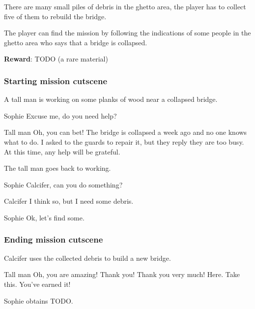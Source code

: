 There are many small piles of debris in the ghetto area, the player has to collect five of them to rebuild the bridge.

The player can find the mission by following the indications of some people in the ghetto area who says that a bridge is collapsed.

\textbf{Reward}: TODO (a rare material)

\subsubsection*{Starting mission cutscene}
\begin{screenplay}

A tall man is working on some planks of wood near a collapsed bridge.

\begin{dialogue}{Sophie}
Excuse me, do you need help?
\end{dialogue}

\begin{dialogue}{Tall man}
Oh, you can bet! The bridge is collapsed a week ago and no one knows what to do. I asked to the guards to repair it, but they reply they are too busy. At this time, any help will be grateful.
\end{dialogue}

The tall man goes back to working.

\begin{dialogue}{Sophie}
Calcifer, can you do something?
\end{dialogue}

\begin{dialogue}{Calcifer}
I think so, but I need some debris.
\end{dialogue}

\begin{dialogue}{Sophie}
Ok, let's find some.
\end{dialogue}

\end{screenplay}

\subsubsection*{Ending mission cutscene}
\begin{screenplay}

Calcifer uses the collected debris to build a new bridge.

\begin{dialogue}[excited]{Tall man}
Oh, you are amazing! Thank you! Thank you very much! Here. Take this. You've earned it!
\end{dialogue}

Sophie obtains TODO.

\end{screenplay}



